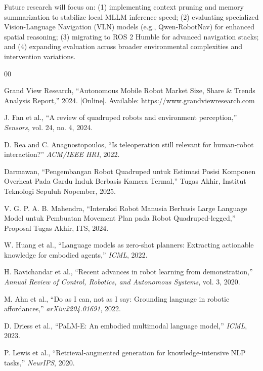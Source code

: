 \documentclass[conference]{IEEEtran}
\begin{document}
Future research will focus on: (1) implementing context pruning and memory summarization to stabilize local MLLM inference speed; (2) evaluating specialized Vision-Language Navigation (VLN) models (e.g., Qwen-RobotNav) for enhanced spatial reasoning; (3) migrating to ROS 2 Humble for advanced navigation stacks; and (4) expanding evaluation across broader environmental complexities and intervention variations.


\begin{thebibliography}{00}

Grand View Research, ``Autonomous Mobile Robot Market Size, Share \& Trends Analysis Report,'' 2024. [Online]. Available: https://www.grandviewresearch.com

J. Fan et al., ``A review of quadruped robots and environment perception,'' \textit{Sensors}, vol. 24, no. 4, 2024.

D. Rea and C. Anagnostopoulos, ``Is teleoperation still relevant for human-robot interaction?'' \textit{ACM/IEEE HRI}, 2022.

Darmawan, ``Pengembangan Robot Quadruped untuk Estimasi Posisi Komponen Overheat Pada Gardu Induk Berbasis Kamera Termal,'' Tugas Akhir, Institut Teknologi Sepuluh Nopember, 2025.

V. G. P. A. B. Mahendra, ``Interaksi Robot Manusia Berbasis Large Language Model untuk Pembuatan Movement Plan pada Robot Quadruped-legged,'' Proposal Tugas Akhir, ITS, 2024.

W. Huang et al., ``Language models as zero-shot planners: Extracting actionable knowledge for embodied agents,'' \textit{ICML}, 2022.

H. Ravichandar et al., ``Recent advances in robot learning from demonstration,'' \textit{Annual Review of Control, Robotics, and Autonomous Systems}, vol. 3, 2020.

M. Ahn et al., ``Do as I can, not as I say: Grounding language in robotic affordances,'' \textit{arXiv:2204.01691}, 2022.

D. Driess et al., ``PaLM-E: An embodied multimodal language model,'' \textit{ICML}, 2023.

P. Lewis et al., ``Retrieval-augmented generation for knowledge-intensive NLP tasks,'' \textit{NeurIPS}, 2020.


\end{thebibliography}
\end{document}
